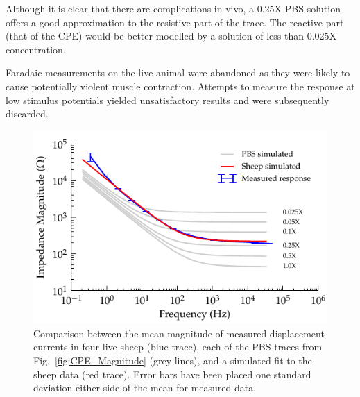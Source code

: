 \documentclass[journal, a4paper]{IEEEtran}
\begin{document}
Although it is clear that there are complications in vivo, a 0.25X PBS {\color{blue} solution} offers a good approximation to the resistive part of the  trace.
The reactive part {\color{blue} (that of the CPE)} would be better modelled by a solution of less than 0.025X concentration.  

{
    \color{blue}
    Faradaic measurements on the live animal were abandoned as they were likely to cause potentially violent muscle contraction. Attempts to measure the response at low stimulus potentials yielded unsatisfactory results and were subsequently discarded. 
}
\begin{figure}
    \begin{center}
        \includegraphics{graphics/displacement-withSheep_impedanceVsFrequency_magnitude}
    \end{center}
    \caption{\color{blue} Comparison between the mean magnitude of measured displacement currents in four live sheep (blue trace), each of the PBS traces from Fig.~\ref{fig:CPE_Magnitude} (grey lines), and a simulated fit to the sheep data (red trace). Error bars have been placed one standard deviation either side of the mean for measured data.}
    \label{fig:displacement_sheepCPEMagnitude}
\end{figure}
\end{document}
